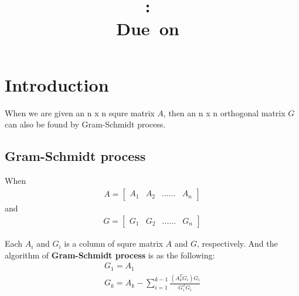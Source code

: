 \documentclass{article}
\title{
    \vspace{2in}
    \textmd{\textbf{\hmwkClass:\ \hmwkTitle}}\\
    \normalsize\vspace{0.1in}\small{Due\ on\ \hmwkDueDate}\\
    \vspace{3in}
}
\author{\textbf{\hmwkAuthorName}}
\date{} %
\begin{document}
\maketitle



\newpage


\section{Introduction}
When we are given an n x n squre matrix $A$, then an n x n orthogonal matrix $G$ can also be found by Gram-Schmidt process. \newline
\subsection{Gram-Schmidt process}
When \newline
\begin{gather}
A = \begin{bmatrix}A_1 & A_2 & ...... & A_n \end{bmatrix}
\end{gather}
and \newline
\begin{gather}
G = \begin{bmatrix}G_1 & G_2 & ...... & G_n\end{bmatrix}
\end{gather}

Each $A_i$ and $G_i$ is a column of squre matrix $A$ and $G$, respectively. And the algorithm of \textbf{Gram-Schmidt process} is as the
following: \newline
\begin{gather}
    G_1 = A_1 \\
    G_k = A_k - \sum_{i=1}^{k-1}{\frac{(A_k^TG_i)G_i}{G_i^TG_i}}
\end{gather}
\end{document}
